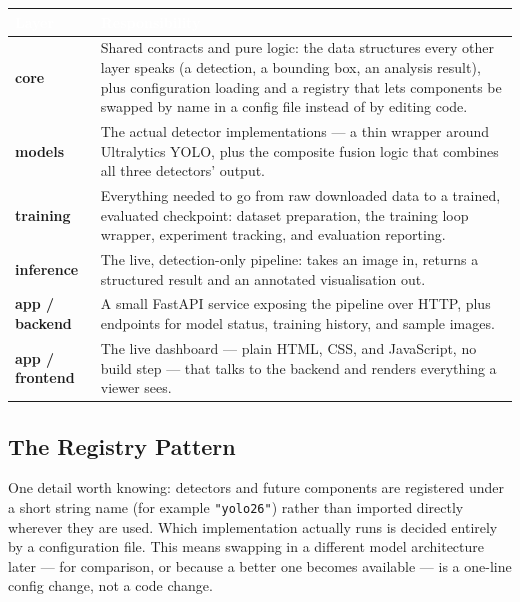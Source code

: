 \documentclass[11pt,a4paper]{article}
\begin{document}
\begin{center}
\renewcommand{\arraystretch}{1.35}
\begin{tabular}{@{}>{\headfont\bfseries}p{3.1cm} p{10.6cm}@{}}
\toprule
\rowcolor{brandslate}
\textcolor{white}{Layer} & \textcolor{white}{Responsibility} \\
\midrule
core & Shared contracts and pure logic: the data structures every other layer speaks
(a detection, a bounding box, an analysis result), plus configuration loading and a registry
that lets components be swapped by name in a config file instead of by editing code. \\
\addlinespace
models & The actual detector implementations --- a thin wrapper around Ultralytics YOLO, plus
the composite fusion logic that combines all three detectors' output. \\
\addlinespace
training & Everything needed to go from raw downloaded data to a trained, evaluated checkpoint:
dataset preparation, the training loop wrapper, experiment tracking, and evaluation reporting. \\
\addlinespace
inference & The live, detection-only pipeline: takes an image in, returns a structured result
and an annotated visualisation out. \\
\addlinespace
app / backend & A small FastAPI service exposing the pipeline over HTTP, plus endpoints for
model status, training history, and sample images. \\
\addlinespace
app / frontend & The live dashboard --- plain HTML, CSS, and JavaScript, no build step ---
that talks to the backend and renders everything a viewer sees. \\
\bottomrule
\end{tabular}
\end{center}

\subsection{The Registry Pattern}
One detail worth knowing: detectors and future components are registered under a short string
name (for example \texttt{"yolo26"}) rather than imported directly wherever they are used.
Which implementation actually runs is decided entirely by a configuration file. This means
swapping in a different model architecture later --- for comparison, or because a better one
becomes available --- is a one-line config change, not a code change.

\end{document}
